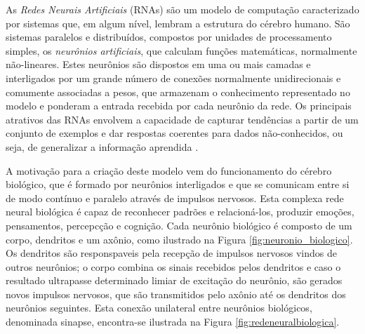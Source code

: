
As \emph{Redes Neurais Artificiais} (RNAs) são um modelo de computação caracterizado por sistemas que, em algum nível, lembram a estrutura do cérebro humano. São sistemas paralelos e distribuídos, compostos por unidades de processamento simples, os \emph{neurônios artificiais}, que calculam funções matemáticas, normalmente não-lineares. Estes neurônios são dispostos em uma ou mais camadas e interligados por um grande número de conexões normalmente unidirecionais e comumente associadas a pesos, que armazenam o conhecimento representado no modelo e ponderam a entrada recebida por cada neurônio da rede. Os principais atrativos das RNAs envolvem a capacidade de capturar tendências a partir de um conjunto de exemplos e dar respostas coerentes para dados não-conhecidos, ou seja, de generalizar a informação aprendida \cite{Teresa:Livro}.

A motivação para a criação deste modelo vem do funcionamento do cérebro biológico, que é formado por neurônios interligados e que se comunicam entre si de modo contínuo e paralelo através de impulsos nervosos. Esta complexa rede neural biológica é capaz de reconhecer padrões e relacioná-los, produzir emoções, pensamentos, percepcção e cognição. Cada neurônio biológico é composto de um corpo, dendritos e um axônio, como ilustrado na Figura \ref{fig:neuronio_biologico}. Os dendritos são responspaveis pela recepção de impulsos nervosos vindos de outros neurônios; o corpo combina os sinais recebidos pelos dendritos e caso o resultado ultrapasse determinado limiar de excitação do neurônio, são gerados novos impulsos nervosos, que são transmitidos pelo axônio até os dendritos dos neurônios seguintes. Esta conexão unilateral entre neurônios biológicos, denominada sinapse, encontra-se ilustrada na Figura \ref{fig:redeneuralbiologica}.

